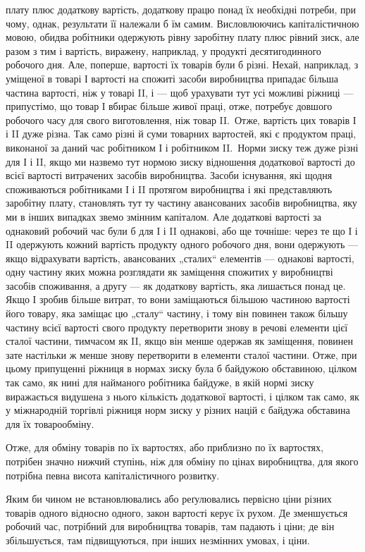 \parcont{}  %
плату плюс додаткову вартість, додаткову працю понад їх необхідні
потреби, при чому, однак, результати її належали б їм
самим. Висловлюючись капіталістичною мовою, обидва робітники
одержують рівну заробітну плату плюс рівний зиск, але разом
з тим і вартість, виражену, наприклад, у продукті десятигодинного
робочого дня. Але, поперше, вартості їх товарів були б
різні. Нехай, наприклад, з уміщеної в товарі І вартості на спожиті
засоби виробництва припадає більша частина вартості, ніж у товарі
II, і — щоб урахувати тут усі можливі ріжниці — припустімо,
що товар І вбирає більше живої праці, отже, потребує довшого
робочого часу для свого виготовлення, ніж товар II.~Отже, вартість
цих товарів І і II дуже різна. Так само різні й суми товарних вартостей,
які є продуктом праці, виконаної за даний час робітником
І і робітником II.~Норми зиску теж дуже різні для І і II,
якщо ми назвемо тут нормою зиску відношення додаткової вартості
до всієї вартості витрачених засобів виробництва. Засоби
існування, які щодня споживаються робітниками І і II протягом
виробництва і які представляють заробітну плату, становлять
тут ту частину авансованих засобів виробництва, яку ми в інших
випадках звемо змінним капіталом. Але додаткові вартості за
однаковий робочий час були б для І і II однакові, або ще точніше:
через те що І і II одержують кожний вартість продукту
одного робочого дня, вони одержують — якщо відрахувати вартість,
авансованих „сталих“ елементів — однакові вартості, одну
частину яких можна розглядати як заміщення спожитих у виробництві
засобів споживання, а другу — як додаткову вартість,
яка лишається понад це. Якщо І зробив більше витрат, то вони
заміщаються більшою частиною вартості його товару, яка заміщає
цю „сталу“ частину, і тому він повинен також більшу
частину всієї вартості свого продукту перетворити знову в речові
елементи цієї сталої частини, тимчасом як II, якщо він
менше одержав як заміщення, повинен зате настільки ж менше
знову перетворити в елементи сталої частини. Отже, при цьому
припущенні ріжниця в нормах зиску була б байдужою обставиною,
цілком так само, як нині для найманого робітника байдуже,
в якій нормі зиску виражається видушена з нього кількість
додаткової вартості, і цілком так само, як у міжнародній торгівлі
ріжниця норм зиску у різних націй є байдужа обставина
для їх товарообміну.

Отже, для обміну товарів по їх вартостях, або приблизно
по їх вартостях, потрібен значно нижчий ступінь, ніж для обміну
по цінах виробництва, для якого потрібна певна висота капіталістичного
розвитку.

Яким би чином не встановлювались або реґулювались первісно
ціни різних товарів одного відносно одного, закон вартості
керує їх рухом. Де зменшується робочий час, потрібний для
виробництва товарів, там падають і ціни; де він збільшується,
там підвищуються, при інших незмінних умовах, і ціни.
